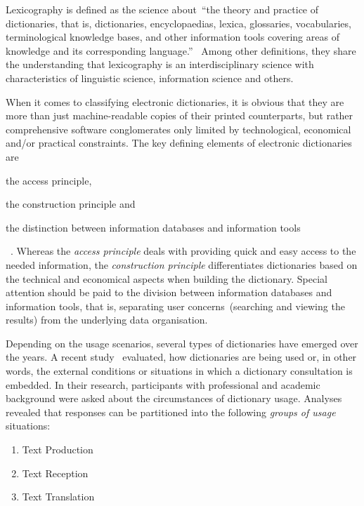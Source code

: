 \documentclass[draft,final]{vutinfth} %
\begin{document}
Lexicography is defined as the science about~\enquote{the theory and practice of dictionaries, that is, dictionaries, encyclopaedias, lexica, glossaries, vocabularies, terminological knowledge bases, and other information tools covering areas of knowledge and its corresponding language.}~\cite{fuertes2017}
Among other definitions, they share the understanding that lexicography is an interdisciplinary science with characteristics of linguistic science, information science and others. 

When it comes to classifying electronic dictionaries, it is obvious that they are more than just machine-readable copies of their printed counterparts, but rather comprehensive software conglomerates only limited by technological, economical and/or practical constraints. The key defining elements of electronic dictionaries are 
\begin{inparaenum}[i)]
		\item the access principle,
		\item the construction principle and
		\item the distinction between information databases and information tools
\end{inparaenum}~\cite{fuertes2011}.
Whereas the \textit{access principle} deals with providing quick and easy access to the needed information, the \textit{construction principle} differentiates dictionaries based on the technical and economical aspects when building the dictionary. Special attention should be paid to the division between information databases and information tools, that is, separating user concerns~(searching and viewing the results) from the underlying data organisation. 

Depending on the usage scenarios, several types of dictionaries have emerged over the years. A recent study~\cite{mueller_spitzer2013} evaluated, how dictionaries are being used or, in other words, the external conditions or situations in which a dictionary consultation is embedded.  
In their research, participants with professional and academic background were asked about the circumstances of dictionary usage. 
Analyses revealed that responses can be partitioned into the following \textit{groups of usage} situations: 
\begin{enumerate}
	\item Text Production
	\item Text Reception
	\item Text Translation
\end{enumerate}
\end{document}
